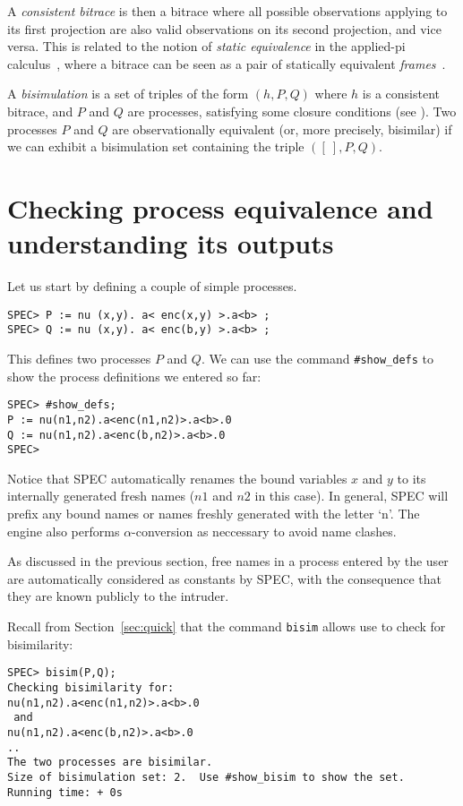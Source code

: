 \documentclass{article}
\begin{document}
A {\em consistent bitrace} is then a bitrace where all possible observations applying
to its first projection are also valid observations on its second projection, and vice versa. 
This is related to the notion of {\em static equivalence} in the applied-pi calculus~\cite{abadi01popl},
where a bitrace can be seen as a pair of statically equivalent {\em frames}~\cite{abadi01popl}. 

A {\em bisimulation} is a set of triples of the form $(h, P, Q)$ where $h$ is a consistent bitrace,
and $P$ and $Q$ are processes, satisfying some closure conditions (see \cite{tiu09corr}). 
Two processes $P$ and $Q$ are observationally equivalent (or, more precisely, bisimilar)
if we can exhibit a bisimulation set containing the triple $([~], P, Q)$.

\section{Checking process equivalence and understanding its outputs}
\label{sec:equiv}

Let us start by defining a couple of simple processes. 
\begin{verbatim}
SPEC> P := nu (x,y). a< enc(x,y) >.a<b> ;
SPEC> Q := nu (x,y). a< enc(b,y) >.a<b> ;
\end{verbatim}
This defines two processes $P$ and $Q$. We can use the command
\texttt{\#show\_defs} to show the process definitions we entered so far:
\begin{verbatim}
SPEC> #show_defs;
P := nu(n1,n2).a<enc(n1,n2)>.a<b>.0
Q := nu(n1,n2).a<enc(b,n2)>.a<b>.0
SPEC> 
\end{verbatim}
Notice that SPEC automatically renames the bound variables $x$ and $y$
to its internally generated fresh names ($n1$ and $n2$ in this case).
In general, SPEC will prefix any bound names or names freshly 
generated with the letter `n'. The engine also performs $\alpha$-conversion
as neccessary to avoid name clashes. 

As discussed in the previous section, free names in a process entered by the user
 are automatically
considered as constants by SPEC, with the consequence that they are known publicly
to the intruder. 

Recall from Section~\ref{sec:quick} that the command \texttt{bisim} allows use to check
for bisimilarity: 
\begin{verbatim}
SPEC> bisim(P,Q);
Checking bisimilarity for: 
nu(n1,n2).a<enc(n1,n2)>.a<b>.0
 and 
nu(n1,n2).a<enc(b,n2)>.a<b>.0
..
The two processes are bisimilar.
Size of bisimulation set: 2.  Use #show_bisim to show the set.
Running time: + 0s
\end{verbatim}
\end{document}
